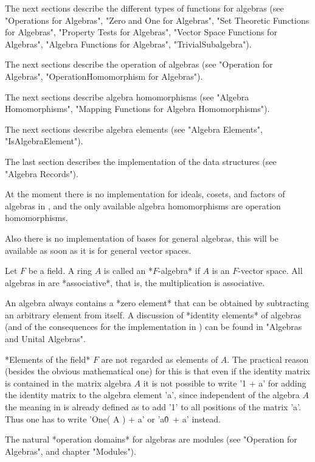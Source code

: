 The next sections describe the different types of functions for algebras
(see "Operations for Algebras", "Zero and One for Algebras", "Set
Theoretic Functions for Algebras", "Property Tests for Algebras", "Vector
Space Functions for Algebras", "Algebra Functions for Algebras",
"TrivialSubalgebra").

The next sections describe the operation of algebras (see "Operation for
Algebras", "OperationHomomorphism for Algebras").

The next sections describe algebra homomorphisms (see "Algebra
Homomorphisms", "Mapping Functions for Algebra Homomorphisms").

The next sections describe algebra elements (see "Algebra Elements",
"IsAlgebraElement").

The last section describes the implementation of the data structures
(see "Algebra Records").

At the moment there is no implementation for ideals, cosets, and factors
of algebras in {\GAP}, and the only available algebra homomorphisms are
operation homomorphisms.

Also there is no implementation of bases for general algebras, this will
be available as soon as it is for general vector spaces.


Let $F$ be a field.  A ring $A$ is called an *$F$-algebra* if $A$ is
an $F$-vector space.  All algebras in {\GAP} are *associative*, that is,
the multiplication is associative.

An algebra always contains a *zero element* that can be obtained by
subtracting an arbitrary element from itself.  A discussion of *identity
elements* of algebras (and of the consequences for the implementation in
{\GAP}) can be found in "Algebras and Unital Algebras".

*Elements of the field* $F$ are not regarded as elements of $A$.  The
practical reason (besides the obvious mathematical one) for this is that
even if the identity matrix is contained in the matrix algebra $A$ it is
not possible to write '1 + a' for adding the identity matrix to the
algebra element 'a', since independent of the algebra $A$ the meaning in
{\GAP} is already defined as to add '1' to all positions of the matrix
'a'.  Thus one has to write 'One( A ) + a' or 'a\^0\ + a' instead.

The natural *operation domains* for algebras are modules
(see "Operation for Algebras", and chapter "Modules").

